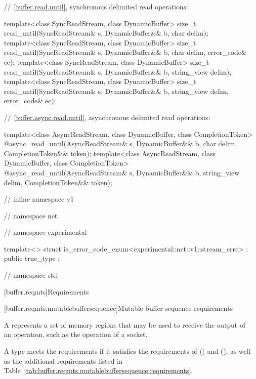 \begin{codeblock}
{{{{  // \ref{buffer.read.until}, synchronous delimited read operations:

  template<class SyncReadStream, class DynamicBuffer>
    size_t read_until(SyncReadStream& s, DynamicBuffer&& b, char delim);
  template<class SyncReadStream, class DynamicBuffer>
    size_t read_until(SyncReadStream& s, DynamicBuffer&& b,
                      char delim, error_code& ec);
  template<class SyncReadStream, class DynamicBuffer>
    size_t read_until(SyncReadStream& s, DynamicBuffer&& b, string_view delim);
  template<class SyncReadStream, class DynamicBuffer>
    size_t read_until(SyncReadStream& s, DynamicBuffer&& b,
                      string_view delim, error_code& ec);

  // \ref{buffer.async.read.until}, asynchronous delimited read operations:

  template<class AsyncReadStream, class DynamicBuffer, class CompletionToken>
    @\DEDUCED@ async_read_until(AsyncReadStream& s,
                             DynamicBuffer&& b, char delim,
                             CompletionToken&& token);
  template<class AsyncReadStream, class DynamicBuffer, class CompletionToken>
    @\DEDUCED@ async_read_until(AsyncReadStream& s,
                             DynamicBuffer&& b, string_view delim,
                             CompletionToken&& token);

} // inline namespace v1
} // namespace net
} // namespace experimental

  template<> struct is_error_code_enum<experimental::net::v1::stream_errc>
    : public true_type {};

} // namespace std
\end{codeblock}



[buffer.reqmts]{Requirements}


[buffer.reqmts.mutablebuffersequence]{Mutable buffer sequence requirements}

\pnum
A  represents a set of memory regions that may be used to receive the output of an operation, such as the  operation of a socket.

\pnum
A type  meets the  requirements if it satisfies the requirements of  () and  (), as well as the additional requirements listed in Table~\ref{tab:buffer.reqmts.mutablebuffersequence.requirements}.

